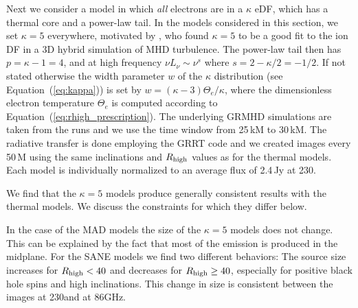 Next we consider a model in which {\em all} electrons are in a $\kappa$ eDF, which has a thermal core and a power-law tail.  In the models considered in this section, we set $\kappa = 5$ everywhere,  motivated by \cite{2016PhRvL.117w5101K}, who found $\kappa = 5$ to be a good fit to the ion DF in a 3D hybrid simulation of MHD turbulence.  The power-law tail then has $p = \kappa - 1 = 4$, and at high frequency $\nu L_\nu \sim \nu^s$ where $s = 2 - \kappa/2 = -1/2$.
{If not stated otherwise the width parameter $w$ of the $\kappa$ distribution (see Equation~(\ref{eq:kappa})) is set by $w = (\kappa - 3) \Theta_e/\kappa$, where the dimensionless electron temperature $\Theta_e$ is computed according to Equation~(\ref{eq:rhigh_prescription}). The underlying GRMHD simulations are taken from the \bhac runs and we use the time window from 25\,kM to 30\,kM. The radiative transfer is done employing the GRRT code \bhoss \citep{Younsi2012,Younsi2020} and we created images every 50\,M using the same inclinations and $R_\mathrm{high}$ values as for the thermal models. Each model is individually normalized to an average flux of 2.4\,Jy at 230\GHz.}

We find that the $\kappa=5$ models produce generally consistent results with the \bhac thermal models. We discuss the constraints for which they differ below.

In the case of the MAD models the size of the $\kappa=5$ models does not change. This can be explained by the fact that most of the emission is produced in the midplane. For the SANE models we find two different behaviors: The source size increases for $R_{\rm high}<40$ and decreases for $R_{\rm high}\geq 40$, especially for positive black hole spins and high inclinations. This change in size is consistent between the images at 230\GHz and at 86GHz.



